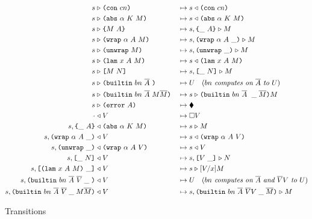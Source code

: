 \begin{figure*}[!ht]
\begin{subfigure}[c]{\linewidth}   %
{\small
\caption{Transitions}
     \begin{alignat*}{2}
      s &\compute \con{cn}                 &{}\mapsto{}& s \return \con{cn}\\
      s &\compute \abs{\alpha}{K}{M}       &{}\mapsto{}& s \return \abs{\alpha}{K}{M}\\
      s &\compute \inst{M}{A}              &{}\mapsto{}& s,\inInstLeftFrame{A} \compute M\\
      s &\compute \wrap{\alpha}{A}{M}      &{}\mapsto{}& s,\inWrapRightFrame{\alpha}{A} \compute M\\
      s &\compute \unwrap{M}               &{}\mapsto{}& s,\inUnwrapFrame{} \compute M\\
      s &\compute \lam{x}{A}{M}            &{}\mapsto{}& s \return \lam{x}{A}{M}\\
      s &\compute \app{M}{N}               &{}\mapsto{}& s,\inAppLeftFrame{N} \compute M\\
      s &\compute \builtin{bn}{\repetition{A}}{} &{}\mapsto{}& 
                                      U \quad (\textit{$bn$ computes on $\repetition{A}$ to $U$})\\
      s &\compute \builtin{bn}{\repetition{A}}{M \repetition{M}} &{}\mapsto{}& 
                                      s \compute \inBuiltin{bn}{\repetition{A}}{}{\_}{\repetition{M}}{M}\\
      s &\compute \error{A} &{}\mapsto{}& \ckerror{}\\
      \cdot &\return V &{}\mapsto{}& \square V\\
      s,\inInstLeftFrame{A} &\return \abs{\alpha}{K}{M} &{}\mapsto{}& s \compute{M} \\
      s,\inWrapRightFrame{\alpha}{A} &\return V         &{}\mapsto{}& s \return \wrap{\alpha}{A}{V}\\
      s,\inUnwrapFrame{} &\return {\wrap{\alpha}{A}{V}} &{}\mapsto{}& s \return V\\
      s,\inAppLeftFrame{N} &\return V                   &{}\mapsto{}& s, \inAppRightFrame{V} \compute N\\
      s,\inAppRightFrame{\lam{x}{A}{M}} &\return V      &{}\mapsto{}& s \compute \subst{V}{x}{M}\\
      s,\inBuiltin{bn}{\repetition{A}}{\repetition{V}}{\_}{} &\return V &{}\mapsto{}& U \quad (\textit{$bn$ computes on $\repetition{A}$ and $\repetition{V}V$ to $U$})\\
      s,  \inBuiltin{bn}{\repetition{A}}{\repetition{V}}{\_}{M \repetition{M}} &\return V &{}\mapsto{}& s, \inBuiltin{bn}{\repetition{A}}{\repetition{V} V}{\_}{\repetition{M}} \compute M\\
    \end{alignat*}
}
\end{subfigure}
\end{figure*}


